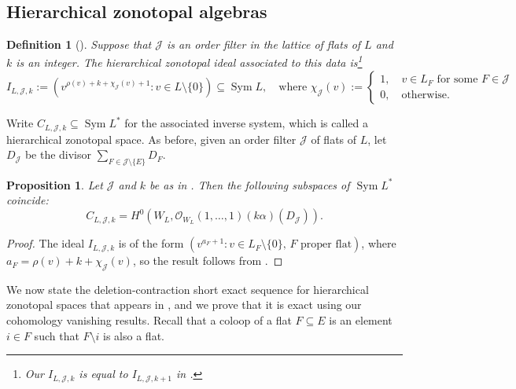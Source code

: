 \documentclass{amsart}
\newtheorem{definition}[theorem]{Definition}
\newtheorem{proposition}[theorem]{Proposition}
\newcommand{\Sym}{\operatorname{Sym}}
\theoremstyle{definition}
\begin{document}
\subsection{Hierarchical zonotopal algebras}\label{ss:hierarchical}

\begin{definition}[{\cite[Definition 
    3.1]{LenzHierarchical}}]\label{hierarchical-definition}
    Suppose that $\mathcal{J}$ is an order filter in the lattice of flats of $L$ and $k$ is an integer. The hierarchical zonotopal ideal associated to this data is\footnote{Our 
        $I_{L,\mathcal{J},k}$ 
    is equal to $I_{L,\mathcal{J},k+1}$ in 
\cite{LenzHierarchical}.}
\[
    I_{L,\mathcal{J},k} := ( v^{\rho(v) + k + \chi_{\mathcal{J}}(v)+1} : v \in L 
    \setminus \{0\} ) \subseteq \Sym L,\quad \text{where } \chi_{\mathcal{J}}(v) := 
    \begin{cases}
        1, \quad v \in L_F \text{ for some $F \in \mathcal{J}$}\\
        0, \quad \text{otherwise.}
    \end{cases}
\]
\end{definition}

Write $C_{L,\mathcal{J},k} \subseteq \Sym L^*$ for the associated inverse system, 
which is called a hierarchical zonotopal space. As before, given an order filter $\mathcal{J}$ of flats of $L$, let $D_{\mathcal{J}}$ be the divisor 
$\sum_{F \in \mathcal{J} \setminus \{E\}}D_F$. 

\begin{proposition}\label{prop:hierarchical}
    Let $\mathcal{J}$ and $k$ be as in . Then the following subspaces of $\Sym L^*$ coincide:
    \[
        C_{L,\mathcal{J},k} = H^0(W_L, \mathcal{O}_{W_L}(1, \ldots, 
        1)(k\alpha)(D_{\mathcal{J}})).
    \]
\end{proposition}
\begin{proof}
The ideal $I_{L,\mathcal{J},k}$ is of the form $(v^{a_F 
+ 1} : v \in L_F \setminus \{0\},\, F \text{ proper flat} )$, where 
$a_F = \rho(v) + k + \chi_{\mathcal{J}}(v)$, so the result follows from 
.
\end{proof}

We now state the deletion-contraction short exact sequence for 
hierarchical zonotopal spaces that appears in \cite[Proposition 
3.17]{LenzHierarchical}, and we prove that it is exact using our cohomology vanishing results. Recall that a coloop of a flat $F \subseteq E$ is an 
element $i \in F$ such that $F \setminus i$ is also a flat.
\end{document}
